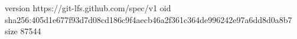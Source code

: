 version https://git-lfs.github.com/spec/v1
oid sha256:405d1e677f93d7d08cd186c9f4aecb46a2f361c364de996242e97a6dd8d0a8b7
size 87544
